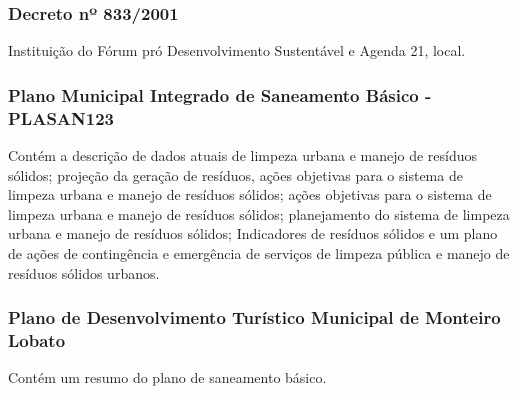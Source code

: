 \begin{subapend}
\begin{subsubapend}
		\subsubsection{Decreto nº 833/2001}
		Instituição do Fórum pró Desenvolvimento Sustentável e Agenda 21, local.
		\subsubsection{Plano Municipal Integrado de Saneamento Básico - PLASAN123}
		Contém a descrição de dados atuais de limpeza urbana e manejo de resíduos sólidos; projeção da geração de resíduos, ações objetivas para o sistema de limpeza urbana e manejo de resíduos sólidos; ações objetivas para o sistema de limpeza urbana e manejo de resíduos sólidos; planejamento do sistema de limpeza urbana e manejo de resíduos sólidos; Indicadores de resíduos sólidos e um plano de ações de contingência e emergência de serviços de limpeza pública e manejo de resíduos sólidos urbanos.
		\subsubsection{Plano de Desenvolvimento Turístico Municipal de Monteiro Lobato}
		Contém um resumo do plano de saneamento básico.
	\end{subsubapend}
\end{subapend}

















